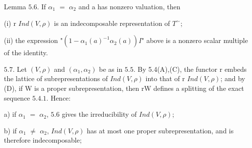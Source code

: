 \documentclass[10pt,a4paper]{article}
\begin{document}
\par Lemma $5.6$. If $\alpha{}_1$ $=$ $\alpha{}_2$ and a has nonzero valuation, then\par
\par (i) r $Ind(V,\rho{})$ is an indecomposable representation of $T^\sim$;\par
\par (ii) the expression "$(1-\alpha{}_1(a)^{-1}\alpha{}_2(a))I$" above is a nonzero scalar multiple of the identity.\par
\par $5.7$. Let $(V,\rho{})$ and $(\alpha{}_1,\alpha{}_2)$ be as in $5.5$. By 5.4(A),(C), the functor r embeds the lattice of subrepresentations of $Ind(V,\rho{})$ into that of r $Ind(V,\rho{})$; and by (D), if W is a proper subrepresentation, then rW defines a splitting of the exact sequence $5.4.1$. Hence:\par
\par a) if $\alpha{}_1$ $=$ $\alpha{}_2$, $5.6$ gives the irreducibility of $Ind(V,\rho{})$;\par
\par b) if $\alpha{}_1$ $\ne{}$ $\alpha{}_2$, $Ind(V,\rho{})$ has at most one proper subrepresentation, and is therefore indecomposable;\par
\end{document}
